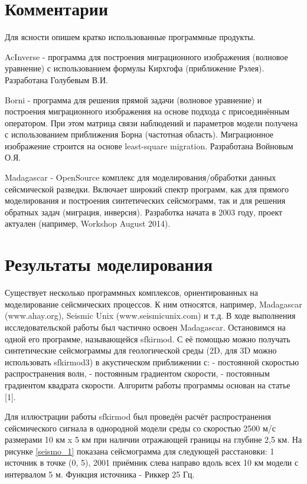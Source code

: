 \documentclass{article}
\begin{document}
\fi

\section{Комментарии}

Для ясности опишем кратко использованные программные продукты.

AcInverse - программа для построения миграционного изображения (волновое уравнение) с использованием формулы Кирхгофа (приближение Рэлея).
Разработана Голубевым В.И.

Borni - программа для решения прямой задачи (волновое уравнение) и построения миграционного изображения на основе подхода с присоединённым оператором.
При этом матрица связи наблюдений и параметров модели получена с использованием приближения Борна (частотная область).
Миграционное изображение строится на основе least-square migration.
Разработана Войновым О.Я.

Madagascar - OpenSource комплекс для моделирования/обработки данных сейсмической разведки.
Включает широкий спектр программ, как для прямого моделирования и построения синтетических сейсмограмм, так и для решения обратных задач (миграция, инверсия).
Разработка начата в 2003 году, проект актуален (например, Workshop August 2014).


\section{Результаты моделирования}

Существует несколько программных комплексов, ориентированных на моделирование сейсмических процессов.
К ним относятся, например, Madagascar (www.ahay.org), Seismic Unix (www.seismicunix.com) и т.д.
В ходе выполнения исследовательской работы был частично освоен Madagascar.
Остановимся на одной его программе, называющейся sfkirmod.
С её помощью можно получать синтетические сейсмограммы для геологической среды (2D, для 3D можно использовать sfkirmod3) в акустическом приближении с:
- постоянной скоростью распространения волн, - постоянным градиентом скорости, - постоянным градиентом квадрата скорости.
Алгоритм работы программы основан на статье [1].

Для иллюстрации работы sfkirmod был проведён расчёт распространения сейсмического сигнала в однородной модели среды со скоростью 2500 м/с размерами 10 км x 5 км при
наличии отражающей границы на глубине 2,5 км.
На рисунке \ref{seismo_1} показана сейсмограмма для следующей расстановки: 1 источник в точке (0, 5), 2001 приёмник слева направо вдоль всех 10 км модели с интервалом 5 м.
Функция источника - Риккер 25 Гц.
\end{document}
